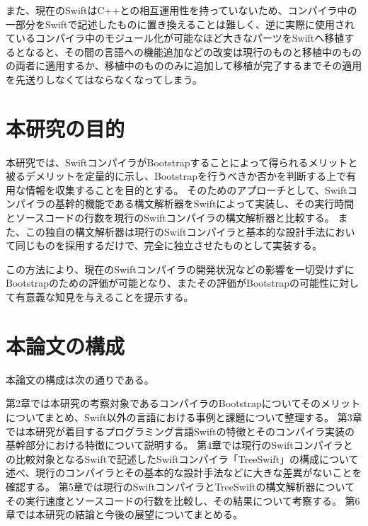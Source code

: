 また、現在のSwiftはC++との相互運用性を持っていないため、コンパイラ中の一部分をSwiftで記述したものに置き換えることは難しく、逆に実際に使用されているコンパイラ中のモジュール化が可能なほど大きなパーツをSwiftへ移植するとなると、その間の言語への機能追加などの改変は現行のものと移植中のものの両者に適用するか、移植中のもののみに追加して移植が完了するまでその適用を先送りしなくてはならなくなってしまう。


\section{本研究の目的}
\label{introduction:purpose}

本研究では、SwiftコンパイラがBootstrapすることによって得られるメリットと被るデメリットを定量的に示し、Bootstrapを行うべきか否かを判断する上で有用な情報を収集することを目的とする。
そのためのアプローチとして、Swiftコンパイラの基幹的機能である構文解析器をSwiftによって実装し、その実行時間とソースコードの行数を現行のSwiftコンパイラの構文解析器と比較する。
また、この独自の構文解析器は現行のSwiftコンパイラと基本的な設計手法において同じものを採用するだけで、完全に独立させたものとして実装する。

この方法により、現在のSwiftコンパイラの開発状況などの影響を一切受けずにBootstrapのための評価が可能となり、またその評価がBootstrapの可能性に対して有意義な知見を与えることを提示する。


\section{本論文の構成}

本論文の構成は次の通りである。

第2章では本研究の考察対象であるコンパイラのBootstrapについてそのメリットについてまとめ、Swift以外の言語における事例と課題について整理する。
第3章では本研究が着目するプログラミング言語Swiftの特徴とそのコンパイラ実装の基幹部分における特徴について説明する。
第4章では現行のSwiftコンパイラとの比較対象となるSwiftで記述したSwiftコンパイラ「TreeSwift」の構成について述べ、現行のコンパイラとその基本的な設計手法などに大きな差異がないことを確認する。
第5章では現行のSwiftコンパイラとTreeSwiftの構文解析器についてその実行速度とソースコードの行数を比較し、その結果について考察する。
第6章では本研究の結論と今後の展望についてまとめる。

